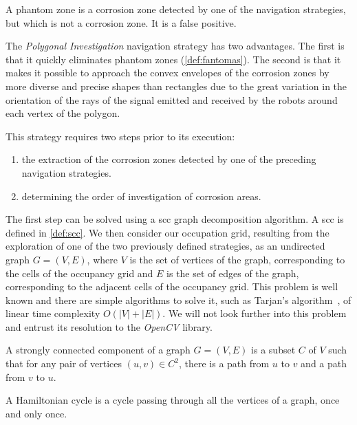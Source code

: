 \begin{definition}
	\label{def:fantomas}
	A phantom zone is a corrosion zone detected by one of the navigation strategies, but which is not a corrosion zone. It is a false positive.
\end{definition}

The \textit{Polygonal Investigation} navigation strategy has two advantages.
The first is that it quickly eliminates phantom zones (\ref{def:fantomas}).
The second is that it makes it possible to approach the convex envelopes of the corrosion zones by more diverse and precise shapes than rectangles due to the great variation in the orientation of the rays of the signal emitted and received by the robots around each vertex of the polygon.

This strategy requires two steps prior to its execution:
\begin{enumerate}
	\item the extraction of the corrosion zones detected by one of the preceding navigation strategies.
	\item determining the order of investigation of corrosion areas.
\end{enumerate}

The first step can be solved using a \gls{scc} graph decomposition algorithm.
A \gls{scc} is defined in \ref{def:scc}.
We then consider our occupation grid, resulting from the exploration of one of the two previously defined strategies, as an undirected graph $G = (V, E)$, where $V$ is the set of vertices of the graph, corresponding to the cells of the occupancy grid and $E$ is the set of edges of the graph, corresponding to the adjacent cells of the occupancy grid.
This problem is well known and there are simple algorithms to solve it, such as Tarjan's algorithm~\cite{enwiki:1148118528}, of linear time complexity $O(|V| + |E|)$.
We will not look further into this problem and entrust its resolution to the \textit{OpenCV} library.

\begin{definition}
	\label{def:scc}
	A strongly connected component of a graph $G = (V, E)$ is a subset $C$ of $V$ such that for any pair of vertices $(u, v) \in C^2$, there is a path from $u$ to $v$ and a path from $v$ to $u$.
\end{definition}

\begin{definition}
	\label{def:hamilton}
	A Hamiltonian cycle is a cycle passing through all the vertices of a graph, once and only once.
\end{definition}

